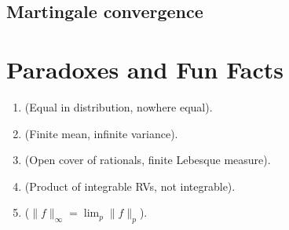 \documentclass[a4paper,10pt]{article}
\begin{document}
\subsection{Martingale convergence}
\section{Paradoxes and Fun Facts}
\begin{enumerate}
 \item (Equal in distribution, nowhere equal). 
 \item (Finite mean, infinite variance).
 \item (Open cover of rationals, finite Lebesque measure).
 \item (Product of integrable RVs, not integrable).
 \item ($\|f\|_\infty = \lim_p \|f\|_p$).
\end{enumerate}
\end{document}
